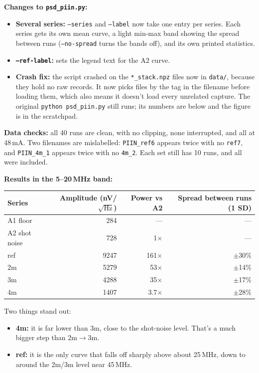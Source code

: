 \begin{tcolorbox}[breakable, colback=gray!4, colframe=gray!50,
 	boxrule=0.4pt, arc=2pt, fontupper=\small,
 	left=6pt, right=6pt, top=4pt, bottom=4pt]
 	\textbf{Changes to \texttt{psd\_piin.py}:}
 	\begin{itemize}
 		\item \textbf{Several series:} \texttt{--series} and \texttt{--label} now take one entry per series. Each series gets its own mean curve, a light min-max band showing the spread between runs (\texttt{--no-spread} turns the bands off), and its own printed statistics.
 		\item \textbf{\texttt{--ref-label}:} sets the legend text for the A2 curve.
 		\item \textbf{Crash fix:} the script crashed on the \texttt{*\_stack.npz} files now in \texttt{data/}, because they hold no raw records. It now picks files by the tag in the filename before loading them, which also means it doesn't load every unrelated capture. The original \texttt{python psd\_piin.py} still runs; its numbers are below and the figure is in the scratchpad.
 	\end{itemize}
 	
 	\textbf{Data checks:} all 40 runs are clean, with no clipping, none interrupted, and all at 48\,mA. Two filenames are mislabelled: \texttt{PIIN\_ref6} appears twice with no \texttt{ref7}, and \texttt{PIIN\_4m\_1} appears twice with no \texttt{4m\_2}. Each set still has 10 runs, and all were included.
 	
 	\textbf{Results in the 5--20\,MHz band:}
 	
 	\begin{center}
 		\begin{tabular}{lrrr}
 			\hline
 			Series & Amplitude (nV/$\sqrt{\mathrm{Hz}}$) & Power vs A2 & Spread between runs (1 SD) \\
 			\hline
 			A1 floor      & 284  & ---            & ---           \\
 			A2 shot noise & 728  & 1$\times$      & ---           \\
 			ref           & 9247 & 161$\times$    & $\pm$30\%     \\
 			2m            & 5279 & 53$\times$     & $\pm$14\%     \\
 			3m            & 4288 & 35$\times$     & $\pm$17\%     \\
 			4m            & 1407 & 3.7$\times$    & $\pm$28\%     \\
 			\hline
 		\end{tabular}
 	\end{center}
 	
 	Two things stand out:
 	\begin{itemize}
 		\item \textbf{4m:} it is far lower than 3m, close to the shot-noise level. That's a much bigger step than 2m$\rightarrow$3m.
 		\item \textbf{ref:} it is the only curve that falls off sharply above about 25\,MHz, down to around the 2m/3m level near 45\,MHz.
 	\end{itemize}
 	

\end{tcolorbox}
